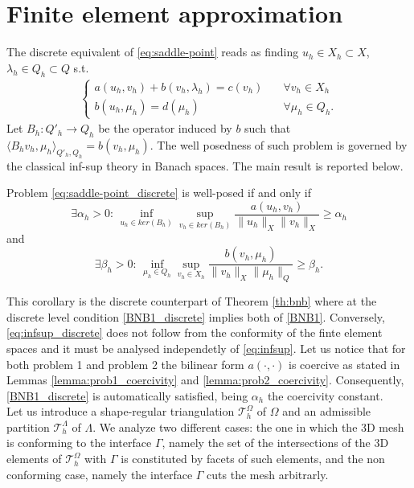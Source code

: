 \section{Finite element approximation}
The discrete equivalent of \eqref{eq:saddle-point} reads as finding $u_h\in X_h\subset X$, $\lambda_h\in Q_h\subset Q$ s.t.
\begin{eqnarray}\label{eq:saddle-point_discrete}
\begin{cases}
a(u_h,v_h)+b(v_h,\lambda_h)=c(v_h)\quad &\forall v_h\in X_h\\
b(u_h,\mu_h)=d(\mu_h) \quad &\forall \mu_h\in Q_h.
\end{cases}
\end{eqnarray}
Let $B_h: Q'_h \longrightarrow Q_h$ be the operator induced by $b$ such that $\langle B_h v_h,\mu _h\rangle_{Q'_h,Q_h} = b(v_h,\mu _h)$.
The well posedness of such problem is governed by the classical inf-sup theory in Banach spaces. The main result is reported below.

\begin{corollary}{\cite[Theorem 2.42]{MR2050138}}
Problem \eqref{eq:saddle-point_discrete} is well-posed if and only if 
\begin{equation}\label{BNB1_discrete}
\exists \alpha_h >0 :\, \inf_{u_h\in ker(B_h)}\sup_{v_h\in ker(B_h)} \frac{a(u_h,v_h)}{\|u_h\|_{X}\|v_h\|_{X}}\geq \alpha_h
\end{equation}
and 
\begin{equation}\label{eq:infsup_discrete}
\exists \beta_h >0:\,\inf_{\mu_h\in Q_h}\sup_{v_h\in X_h} \frac{b(v_h,\mu_h)}{\|v_h\|_{X}\|\mu_h\|_{Q}}\geq \beta_h .
\end{equation}
\end{corollary}
This corollary is the discrete counterpart of Theorem \ref{th:bnb} where at the discrete level condition \eqref{BNB1_discrete} implies both of \eqref{BNB1}. Conversely, \eqref{eq:infsup_discrete} does not follow from the conformity of the finte element spaces and it must be analysed independetly of \eqref{eq:infsup}.  
Let us notice that for both problem 1 and problem 2 the bilinear form $a(\cdot, \cdot)$ is coercive as stated in Lemmas \eqref{lemma:prob1_coercivity} and \eqref{lemma:prob2_coercivity}. Consequently, \eqref{BNB1_discrete} is automatically satisfied, being $\alpha_h$ the coercivity constant.\\

Let us introduce a shape-regular triangulation $\mathcal{T}^{\Omega}_h$ of $\Omega$ and an admissible partition $\mathcal{T}^{\Lambda}_{h}$ of $\Lambda$. 
We analyze two different cases: the one in which the 3D mesh is conforming to the interface $\Gamma$, namely the set of the intersections of the 3D elements of $\mathcal{T}^{\Omega}_h$ with $\Gamma$ is constituted by facets of such elements, and the non conforming case, namely the interface $\Gamma$ cuts the mesh arbitrarly.

